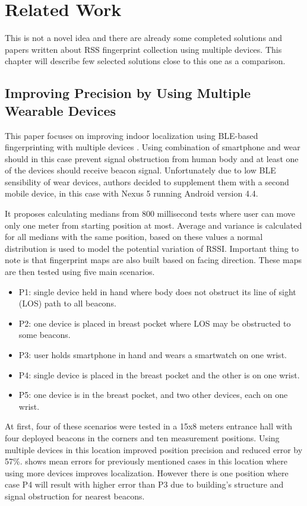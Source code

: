 \chapter{Related Work}\label{sec:RelatedWork}
This is not a novel idea and there are already some completed solutions and papers written about RSS fingerprint collection using multiple devices. This chapter will describe few selected solutions close to this one as a comparison.

\section{Improving Precision by Using Multiple Wearable Devices}\label{sec:IPUMWD}
This paper focuses on improving indoor localization using BLE-based fingerprinting with multiple devices \cite{IPBLEIUMWD}. Using combination of smartphone and wear should in this case prevent signal obstruction from human body and at least one of the devices should receive beacon signal. Unfortunately due to low BLE sensibility of wear devices, authors decided to supplement them with a second mobile device, in this case with Nexus 5 running Android version 4.4.

It proposes calculating medians from 800 millisecond tests where user can move only one meter from starting position at most. Average and variance is calculated for all medians with the same position, based on these values a normal distribution is used to model the potential variation of RSSI. Important thing to note is that fingerprint maps are also built based on facing direction. These maps are then tested using five main scenarios.

\begin{itemize}
	\item P1: single device held in hand where body does not obstruct its line of sight (LOS) path to all beacons.
	\item P2: one device is placed in breast pocket where LOS may be obstructed to some beacons.
	\item P3: user holds smartphone in hand and wears a smartwatch on one wrist.
	\item P4: single device is placed in the breast pocket and the other is on one wrist.
	\item P5: one device is in the breast pocket, and two other devices, each on one wrist.
\end{itemize} 

At first, four of these scenarios were tested in a 15x8 meters entrance hall with four deployed beacons in the corners and ten measurement positions. Using multiple devices in this location improved position precision and reduced error by 57\%.  shows mean errors for previously mentioned cases in this location where using more devices improves localization. However there is one position where case P4 will result with higher error than P3 due to building's structure and signal obstruction for nearest beacons.

